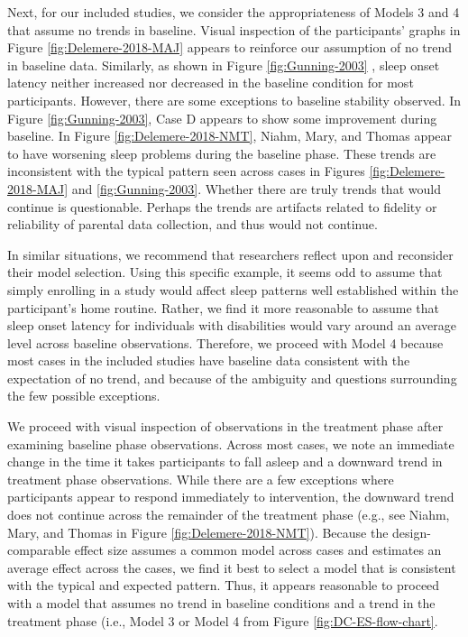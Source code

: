 \documentclass[
]{book}
\begin{document}
Next, for our included studies, we consider the appropriateness of Models 3 and 4 that assume no trends in baseline. Visual inspection of the participants' graphs in Figure \ref{fig:Delemere-2018-MAJ} \citep{delemere2018ParentImplemented} appears to reinforce our assumption of no trend in baseline data. Similarly, as shown in Figure \ref{fig:Gunning-2003} \citep{gunning2003Psychological}, sleep onset latency neither increased nor decreased in the baseline condition for most participants. However, there are some exceptions to baseline stability observed. In Figure \ref{fig:Gunning-2003}, Case D appears to show some improvement during baseline. In Figure \ref{fig:Delemere-2018-NMT}, Niahm, Mary, and Thomas appear to have worsening sleep problems during the baseline phase. These trends are inconsistent with the typical pattern seen across cases in Figures \ref{fig:Delemere-2018-MAJ} and \ref{fig:Gunning-2003}. Whether there are truly trends that would continue is questionable. Perhaps the trends are artifacts related to fidelity or reliability of parental data collection, and thus would not continue.

In similar situations, we recommend that researchers reflect upon and reconsider their model selection. Using this specific example, it seems odd to assume that simply enrolling in a study would affect sleep patterns well established within the participant's home routine. Rather, we find it more reasonable to assume that sleep onset latency for individuals with disabilities would vary around an average level across baseline observations. Therefore, we proceed with Model 4 because most cases in the included studies have baseline data consistent with the expectation of no trend, and because of the ambiguity and questions surrounding the few possible exceptions.

We proceed with visual inspection of observations in the treatment phase after examining baseline phase observations. Across most cases, we note an immediate change in the time it takes participants to fall asleep and a downward trend in treatment phase observations. While there are a few exceptions where participants appear to respond immediately to intervention, the downward trend does not continue across the remainder of the treatment phase (e.g., see Niahm, Mary, and Thomas in Figure \ref{fig:Delemere-2018-NMT}). Because the design-comparable effect size assumes a common model across cases and estimates an average effect across the cases, we find it best to select a model that is consistent with the typical and expected pattern. Thus, it appears reasonable to proceed with a model that assumes no trend in baseline conditions and a trend in the treatment phase (i.e., Model 3 or Model 4 from Figure \ref{fig:DC-ES-flow-chart}.
\end{document}
